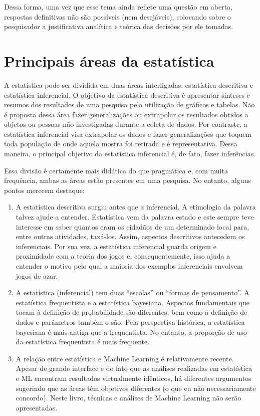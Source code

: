 \documentclass[
]{book}
\begin{document}
Dessa forma, uma vez que esse tema ainda reflete uma questão em aberta, respostas definitivas não são possíveis (nem desejáveis), colocando sobre o pesquisador a justificativa analítica e teórica das decisões por ele tomadas.

\hypertarget{principais-uxe1reas-da-estatuxedstica}{%
\section{Principais áreas da estatística}\label{principais-uxe1reas-da-estatuxedstica}}

A estatística pode ser dividida em duas áreas interligadas: estatística descritiva e estatística inferencial. O objetivo da estatística descritiva é apresentar sínteses e resumos dos resultados de uma pesquisa pela utilização de gráficos e tabelas. Não é proposta dessa área fazer generalizações ou extrapolar os resultados obtidos a objetos ou pessoas não investigadas durante a coleta de dados. Por contraste, a estatística inferencial visa extrapolar os dados e fazer generalizações que toquem toda população de onde aquela mostra foi retirada e é representativa. Dessa maneira, o principal objetivo da estatística inferencial é, de fato, fazer inferências.

Essa divisão é certamente mais didática do que pragmática e, com muita frequência, ambas as áreas estão presentes em uma pesquisa. No entanto, alguns pontos merecem destaque:

\begin{enumerate}
\def\labelenumi{\arabic{enumi}.}
\item
  A estatística descritiva surgiu antes que a inferencial. A etimologia da palavra talvez ajude a entender. Estatística vem da palavra estado e este sempre teve interesse em saber quantos eram os cidadãos de um determinado local para, entre outras atividades, taxá-los. Assim, aspectos descritivos antecedem os inferenciais. Por sua vez, a estatística inferencial guarda origem e proximidade com a teoria dos jogos e, consequentemente, isso ajuda a entender o motivo pelo qual a maioria dos exemplos inferenciais envolvem jogos de azar.
\item
  A estatística (inferencial) tem duas ``escolas'' ou ``formas de pensamento''. A estatística frequentista e a estatística bayesiana. Aspectos fundamentais que tocam à definição de probabilidade são diferentes, bem como a definição de dados e parâmetros também o são. Pela perspectiva histórica, a estatística bayesiana é mais antiga que a frequentista. No entanto, a proporção de uso da estatística frequentista é mais frequente.
\item
  A relação entre estatística e Machine Learning é relativamente recente. Apesar de grande interface e do fato que as análises realizadas em estatística e ML encontram resultados virtualmente idênticos, há diferentes argumentos sugerindo que as áreas têm objetivos diferentes (o que eu não necessariamente concordo). Neste livro, técnicas e análises de Machine Learning não serão apresentadas.
\end{enumerate}
\end{document}
